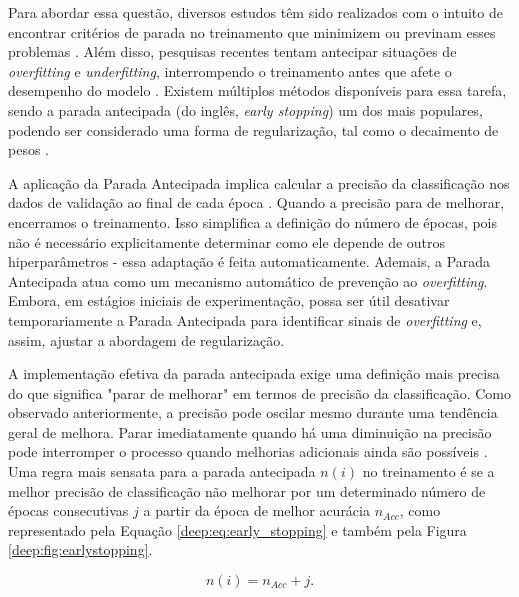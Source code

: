 Para abordar essa questão, diversos estudos têm sido realizados com o intuito de encontrar critérios de parada no treinamento que minimizem ou previnam esses problemas \citep{Prechelt1998AutomaticCriteria}. Além disso, pesquisas recentes tentam antecipar situações de \textit{overfitting} e \textit{underfitting}, interrompendo o treinamento antes que afete o desempenho do modelo \citep{VilaresFerro2023EarlyNetworks}. Existem múltiplos métodos disponíveis para essa tarefa, sendo a parada antecipada (do inglês, \textit{early stopping}) um dos mais populares, podendo ser considerado uma forma de regularização, tal como o decaimento de pesos \cite{VilaresFerro2023EarlyNetworks}.

A aplicação da Parada Antecipada implica calcular a precisão da classificação nos dados de validação ao final de cada época \citep{Prechelt1998AutomaticCriteria}. Quando a precisão para de melhorar, encerramos o treinamento. Isso simplifica a definição do número de épocas, pois não é necessário explicitamente determinar como ele depende de outros hiperparâmetros - essa adaptação é feita automaticamente. Ademais, a Parada Antecipada atua como um mecanismo automático de prevenção ao \textit{overfitting}. Embora, em estágios iniciais de experimentação, possa ser útil desativar temporariamente a Parada Antecipada para identificar sinais de \textit{overfitting} e, assim, ajustar a abordagem de regularização.

A implementação efetiva da parada antecipada exige uma definição mais precisa do que significa "parar de melhorar" em termos de precisão da classificação. Como observado anteriormente, a precisão pode oscilar mesmo durante uma tendência geral de melhora. Parar imediatamente quando há uma diminuição na precisão pode interromper o processo quando melhorias adicionais ainda são possíveis \citep{Prechelt1998EarlyWhen}. Uma regra mais sensata para a parada antecipada $n(i)$ no treinamento é se a melhor precisão de classificação não melhorar por um determinado número de épocas consecutivas $j$ a partir da época de melhor acurácia $n_{Acc}$, como representado pela Equação \ref{deep:eq:early_stopping} e também pela Figura \ref{deep:fig:earlystopping}.

\begin{equation}
    \label{deep:eq:early_stopping}
    n(i) = n_{Acc} + j.
\end{equation}


